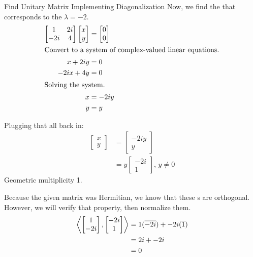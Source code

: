 \begin{example}{Find Unitary Matrix Implementing Diagonalization}
  Now, we find the  that corresponds to the  $\lambda = -2$.
  \begin{align*}
    \begin{bmatrix}
      1 & 2i \\
      -2i & 4
    \end{bmatrix}
            \begin{bmatrix}
              x \\ y
            \end{bmatrix} &=
                            \begin{bmatrix}
                              0 \\ 0
                            \end{bmatrix} \\
    \intertext{Convert to a system of complex-valued linear equations.}
    x + 2iy &= 0 \\
    -2ix + 4y &= 0 \\
    \intertext{Solving the system.}
    x &= -2iy \\
    y &= y
  \end{align*}

  Plugging that all back in:
  \begin{align*}
    \begin{bmatrix}
      x \\ y
    \end{bmatrix} &=
                    \begin{bmatrix}
                      -2iy \\ y
                    \end{bmatrix} \\
    &= y
      \begin{bmatrix}
        -2i \\ 1
      \end{bmatrix}, \, y \neq 0
  \end{align*}
  Geometric multiplicity 1.

  Because the given matrix was Hermitian, we know that these s are orthogonal.
  However, we will verify that property, then normalize them.
  \begin{align*}
    \left\langle 
    \begin{bmatrix}
      1 \\ -2i
    \end{bmatrix}, 
    \begin{bmatrix}
      -2i \\ 1
    \end{bmatrix} \right\rangle &= 1 (\overline{-2i}) + -2i (\overline{1}) \\
                   &= 2i + -2i \\
                   &= 0
  \end{align*}


\end{example}
